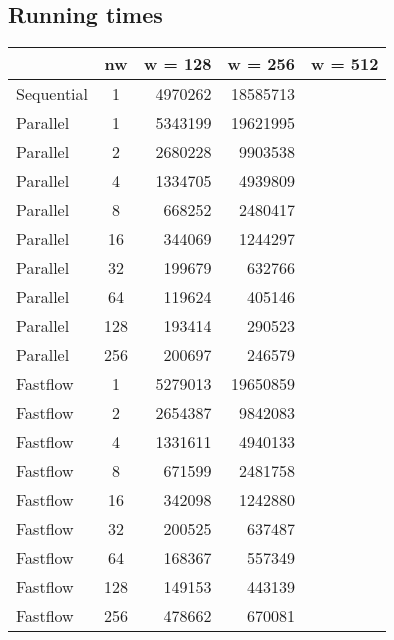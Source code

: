 \subsection{Running times}
\begin{table}[]
\centering
\begin{tabular}{|l|c|r|r|r|}
\hline
\multicolumn{1}{|c|}{} & nw & \multicolumn{1}{c|}{w = 128} & \multicolumn{1}{c|}{w = 256} & \multicolumn{1}{c|}{w = 512} \\ \hline
Sequential & 1   & 4970262 & 18585713 &  \\ \hline
Parallel   & 1   & 5343199 & 19621995 &  \\ \hline
Parallel   & 2   & 2680228 & 9903538  &  \\ \hline
Parallel   & 4   & 1334705 & 4939809  &  \\ \hline
Parallel   & 8   & 668252  & 2480417  &  \\ \hline
Parallel   & 16  & 344069  & 1244297  &  \\ \hline
Parallel   & 32  & 199679  & 632766   &  \\ \hline
Parallel   & 64  & 119624  & 405146   &  \\ \hline
Parallel   & 128 & 193414  & 290523   &  \\ \hline
Parallel   & 256 & 200697  & 246579   &  \\ \hline
Fastflow   & 1   & 5279013 & 19650859 &  \\ \hline
Fastflow   & 2   & 2654387 & 9842083  &  \\ \hline
Fastflow   & 4   & 1331611 & 4940133  &  \\ \hline
Fastflow   & 8   & 671599  & 2481758  &  \\ \hline
Fastflow   & 16  & 342098  & 1242880  &  \\ \hline
Fastflow   & 32  & 200525  & 637487   &  \\ \hline
Fastflow   & 64  & 168367  & 557349   &  \\ \hline
Fastflow   & 128 & 149153  & 443139   &  \\ \hline
Fastflow   & 256 & 478662  & 670081   &  \\ \hline
\end{tabular}
\end{table}